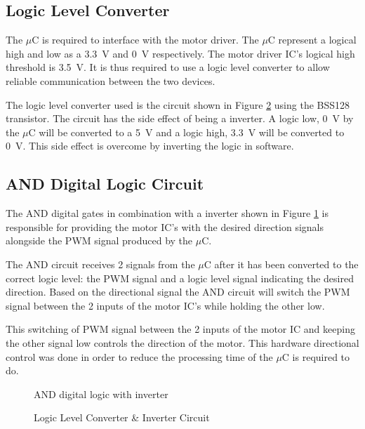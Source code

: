 \documentclass[a4paper,12pt]{article}
\begin{document}
	\subsection{Logic Level Converter}
	
	The $\mu$C is required to interface with the motor driver. The $\mu$C represent a logical high and low as a \SI{3.3}{V} and \SI{0}{V} respectively. The motor driver IC's logical high threshold is \SI{3.5}{V}. It is thus required to use a logic level converter to allow reliable communication between the two devices.
	
	The logic level converter used is the circuit shown in Figure \ref{fig:interterCirc} using the BSS128 transistor. The circuit has the side effect of being a inverter. A logic low, \SI{0}{V} by the $\mu$C will be converted to a \SI{5}{V} and a logic high, \SI{3.3}{V} will be converted to \SI{0}{V}. This side effect is overcome by inverting the logic in software.
	
	\subsection{AND Digital Logic Circuit}
	
	The AND digital gates in combination with a inverter shown in Figure \ref{fig:andCircuit} is responsible for providing the motor IC's with the desired direction signals alongside the PWM signal produced by the $\mu$C.
	
	The AND circuit receives 2 signals from the $\mu$C after it has been converted to the correct logic level: the PWM signal and a logic level signal indicating the desired direction. Based on the directional signal the AND circuit will switch the PWM signal between the 2 inputs of the motor IC's while holding the other low. %
	
	This switching of PWM signal between the 2 inputs of the motor IC and keeping the other signal low controls the direction of the motor. This hardware directional control was done in order to reduce the processing time of the $\mu$C is required to do.
	
\begin{figure}[h]
	\centering
	
	\caption{AND digital logic with inverter}
	\label{fig:andCircuit}
\end{figure}
	
	
	
	
	\begin{figure}[h]
		\centering
		
		\caption{Logic Level Converter \& Inverter Circuit}
		\label{fig:interterCirc}
	\end{figure}
	
\end{document}
